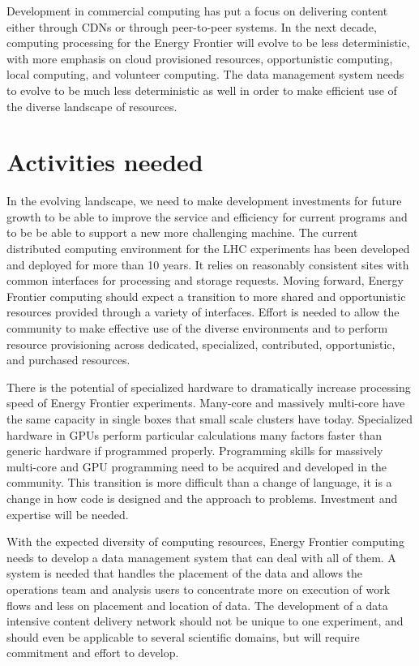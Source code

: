 Development in commercial computing has put a focus on delivering
content either through CDNs or through peer-to-peer systems.  In the
next decade, computing processing for the Energy Frontier will evolve
to be less deterministic, with more emphasis on cloud provisioned
resources, opportunistic computing, local computing, and volunteer
computing.  The data management system needs to evolve to be much less
deterministic as well in order to make efficient use of the diverse
landscape of resources.


\section{Activities needed}
\label{sec:comp-activities}
In the evolving landscape, we need to make development investments for
future growth to be able to improve the service and efficiency for
current programs and to be be able to support a new more challenging
machine.  The current distributed computing environment for the LHC
experiments has been developed and deployed for more than 10 years.
It relies on reasonably consistent sites with common interfaces for
processing and storage requests.  Moving forward, Energy Frontier
computing should expect a transition to more shared and opportunistic
resources provided through a variety of interfaces.  Effort is needed
to allow the community to make effective use of the diverse
environments and to perform resource provisioning across dedicated,
specialized, contributed, opportunistic, and purchased resources.

There is the potential of specialized hardware to dramatically
increase processing speed of Energy Frontier experiments.  Many-core
and massively multi-core have the same capacity in single boxes that
small scale clusters have today.  Specialized hardware in GPUs perform
particular calculations many factors faster than generic hardware if
programmed properly.  Programming skills for massively multi-core and
GPU programming need to be acquired and developed in the community.
This transition is more difficult than a change of language, it is a
change in how code is designed and the approach to problems.
Investment and expertise will be needed.

With the expected diversity of computing resources, Energy Frontier
computing needs to develop a data management system that can deal with
all of them.  A system is needed that handles the placement of the data and
allows the operations team and analysis users to concentrate more on
execution of work flows and less on placement and location of data.  
The development of a data intensive content delivery network
should not be unique to one experiment, and should even be applicable
to several scientific domains, but will require commitment and effort
to develop.





